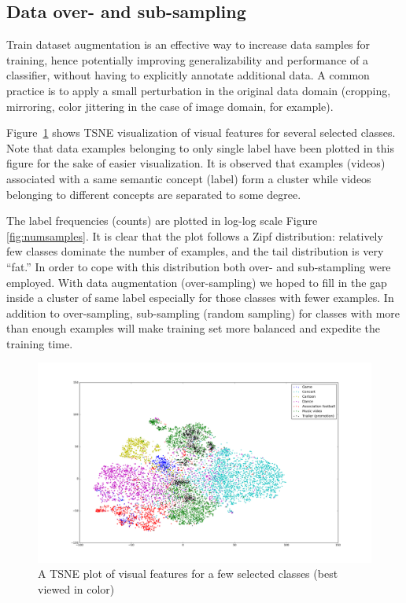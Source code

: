 \documentclass[runningheads]{llncs}
\begin{document}
\subsection{Data over- and sub-sampling} \label{sub:augmentation}
Train dataset augmentation is an effective way to increase data samples for training, hence potentially improving generalizability and performance of a classifier, without having to explicitly annotate additional data.
A common practice is to apply a small perturbation in the original data domain (cropping, mirroring, color jittering in the case of image domain, for example).

Figure~\ref{fig:tsne} shows TSNE visualization of visual features for several selected classes.
Note that data examples belonging to only single label have been plotted in this figure for the sake of easier visualization.
It is observed that examples (videos) associated with a same semantic concept (label) form a cluster while videos belonging to different concepts are separated to some degree.

The label frequencies (counts) are plotted in log-log scale Figure \ref{fig:numsamples}.
It is clear that the plot follows a Zipf distribution: relatively few classes dominate the number of examples, and the tail distribution is very ``fat.''
In order to cope with this distribution both over- and sub-stampling were employed.
With data augmentation (over-sampling) we hoped to fill in the gap inside a cluster of same label especially for those classes with fewer examples.
In addition to over-sampling, sub-sampling (random sampling) for classes with more than enough examples will make training set more balanced and expedite the training time.

\begin{figure}
  \includegraphics[width=\linewidth]{./figures/tsne-vfeat-large2.png}
  \caption{A TSNE plot of visual features for a few selected classes (best viewed in color)}
  \label{fig:tsne}
\end{figure}
\end{document}
